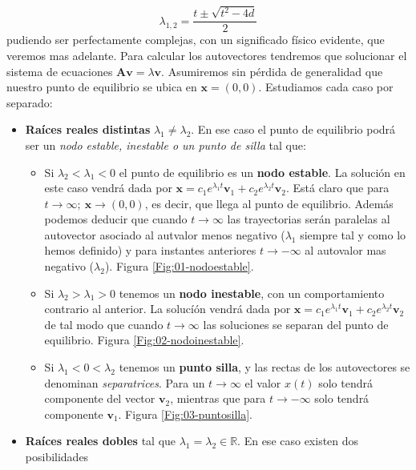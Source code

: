 \documentclass[12pt,a4paper]{article}
\numberwithin{equation}{section}
\numberwithin{figure}{section}
\newcommand{\vn}{\mathbf{v}}
\newcommand{\xn}{\mathbf{x}}
\newcommand{\An}{\mathbf{A}}
\begin{document}
\begin{equation}
\lambda_{1,2} =  \dfrac{t \pm \sqrt{t^2 - 4 d}}{2}
\end{equation}
pudiendo ser perfectamente complejas, con un significado físico evidente, que veremos mas adelante. Para calcular los autovectores tendremos que solucionar el sistema de ecuaciones $\An \vn = \lambda \vn$. Asumiremos sin pérdida de generalidad que nuestro punto de equilibrio se ubica en $\xn = (0,0)$. Estudiamos cada caso por separado:

\begin{itemize}
\item \textbf{Raíces reales distintas} $\lambda_1 \neq \lambda_2$. En ese caso el punto de equilibrio podrá ser un \textit{nodo estable, inestable o un punto de silla} tal que:

\begin{itemize}
\item Si $\lambda_2 < \lambda_1 < 0$ el punto de equilibrio es un \textbf{nodo estable}. La solución en este caso vendrá dada por $\xn = c_1 e^{\lambda_1 t} \vn_1 + c_2 e^{\lambda_2 t} \vn_2$. Está claro que para $t \rightarrow \infty; \ \xn \rightarrow (0,0)$, es decir, que llega al punto de equilibrio. Además podemos deducir que cuando $t \rightarrow \infty$ las trayectorias serán paralelas al autovector asociado al autvalor menos negativo ($\lambda_1$ siempre tal y como lo hemos definido) y para instantes anteriores $t \rightarrow - \infty$ al autovalor mas negativo ($\lambda_2$). Figura \ref{Fig:01-nodoestable}.

\item Si $\lambda_2 > \lambda_1 > 0$ tenemos un \textbf{nodo inestable}, con un comportamiento contrario al anterior. La solucíón vendrá dada por $\xn = c_1 e^{\lambda_1 t} \vn_1 + c_2 e^{\lambda_2 t} \vn_2$ de tal modo que cuando $t \rightarrow \infty$ las soluciones se separan del punto de equilibrio. Figura \ref{Fig:02-nodoinestable}.

\item Si $\lambda_1 < 0 < \lambda_2$ tenemos un \textbf{punto silla}, y las rectas de los autovectores se denominan \textit{separatrices}. Para un $t \rightarrow \infty$ el valor $x(t)$ solo tendrá componente del vector $\vn_2$, mientras que para $t \rightarrow - \infty$  solo tendrá componente $\vn_1$. Figura \ref{Fig:03-puntosilla}.




\end{itemize}


\item \textbf{Raíces reales dobles} tal que $\lambda_1 = \lambda_2 \in \mathbb{R}$. En ese caso existen dos posibilidades


\end{itemize}
\end{document}

